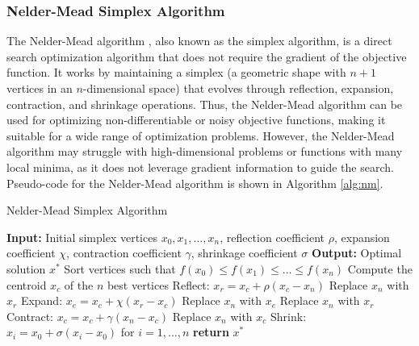 \documentclass{article}[12pt]
\begin{document}
\subsubsection*{Nelder-Mead Simplex Algorithm}
The Nelder-Mead algorithm \cite{NelderMead-1965}, also known as the simplex algorithm, is a direct search optimization algorithm that does not require the gradient of the objective function.
It works by maintaining a simplex (a geometric shape with $n+1$ vertices in an $n$-dimensional space) that evolves through reflection, expansion, contraction, and shrinkage operations.
Thus, the Nelder-Mead algorithm can be used for optimizing non-differentiable or noisy objective functions, making it suitable for a wide range of optimization problems.
However, the Nelder-Mead algorithm may struggle with high-dimensional problems or functions with many local minima, as it does not leverage gradient information to guide the search.
Pseudo-code for the Nelder-Mead algorithm is shown in Algorithm \ref{alg:nm}.
\begin{algorithm}[H]
\caption{Nelder-Mead Simplex Algorithm}\label{alg:nm}
\begin{algorithmic}[1]
\State \textbf{Input:} Initial simplex vertices $x_0, x_1, \ldots, x_n$, reflection coefficient $\rho$, expansion coefficient $\chi$, contraction coefficient $\gamma$, shrinkage coefficient $\sigma$
\State \textbf{Output:} Optimal solution $x^*$
\State Sort vertices such that $f(x_0) \leq f(x_1) \leq \ldots \leq f(x_n)$
    \State Compute the centroid $x_c$ of the $n$ best vertices
    \State Reflect: $x_r = x_c + \rho(x_c - x_n)$
        \State Replace $x_n$ with $x_r$
        \State Expand: $x_e = x_c + \chi(x_r - x_c)$
            \State Replace $x_n$ with $x_e$
        \Else
            \State Replace $x_n$ with $x_r$
        \EndIf
    \Else
        \State Contract: $x_c = x_c + \gamma(x_n - x_c)$
            \State Replace $x_n$ with $x_c$
        \Else
            \State Shrink: $x_i = x_0 + \sigma(x_i - x_0)$ for $i = 1, \ldots, n$
        \EndIf
    \EndIf
\EndWhile
\State \textbf{return} $x^*$
\end{algorithmic}
\end{algorithm}
\end{document}
